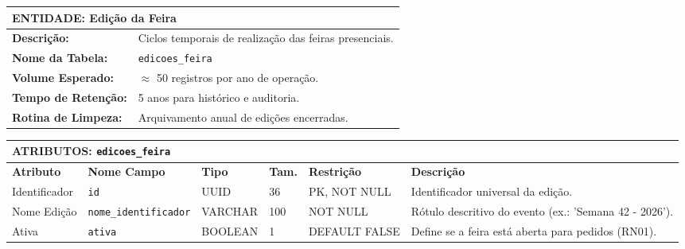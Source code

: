 \documentclass[12pt,a4paper]{article}
\begin{document}
\begin{spacing}{1.0}

\small

\noindent

\begin{tabularx}{\textwidth}{|p{3.0cm}|X|}

\hline

\multicolumn{2}{|l|}{\textbf{ENTIDADE: Edição da Feira}} \\ \hline

\textbf{Descrição:} & Ciclos temporais de realização das feiras presenciais. \\ \hline

\textbf{Nome da Tabela:} & \texttt{edicoes\_feira} \\ \hline

\textbf{Volume Esperado:} & $\approx$ 50 registros por ano de operação. \\ \hline

\textbf{Tempo de Retenção:} & 5 anos para histórico e auditoria. \\ \hline

\textbf{Rotina de Limpeza:} & Arquivamento anual de edições encerradas. \\ \hline

\end{tabularx}

\vspace{0.25cm}

\noindent

\begin{tabularx}{\textwidth}{|p{1.6cm}|p{1.9cm}|p{1.2cm}|p{0.7cm}|p{1.9cm}|X|}

\hline

\multicolumn{6}{|l|}{\textbf{ATRIBUTOS: \texttt{edicoes\_feira}}} \\ \hline

\textbf{Atributo} & \textbf{Nome Campo} & \textbf{Tipo} & \textbf{Tam.} & \textbf{Restrição} & \textbf{Descrição} \\ \hline

Identificador & \texttt{id} & UUID & 36 & PK, NOT NULL & Identificador universal da edição. \\ \hline

Nome Edição & \texttt{nome\_identificador} & VARCHAR & 100 & NOT NULL & Rótulo descritivo do evento (ex.: 'Semana 42 - 2026'). \\ \hline

Ativa & \texttt{ativa} & BOOLEAN & 1 & DEFAULT FALSE & Define se a feira está aberta para pedidos (RN01). \\ \hline


\end{tabularx}
\end{spacing}
\end{document}

